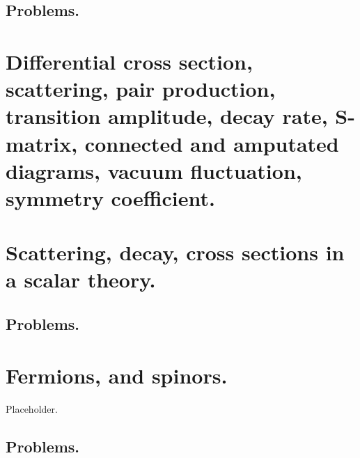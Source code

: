       \section{Problems.}
         
         
         
         
         
         
   \chapter{Differential cross section, scattering, pair production, transition amplitude, decay rate, S-matrix, connected and amputated diagrams, vacuum fluctuation, symmetry coefficient.}
      
   \chapter{Scattering, decay, cross sections in a scalar theory.}
      
      \section{Problems.}
         
         
         
   \chapter{Fermions, and spinors.}
      Placeholder.
      \section{Problems.}
         
